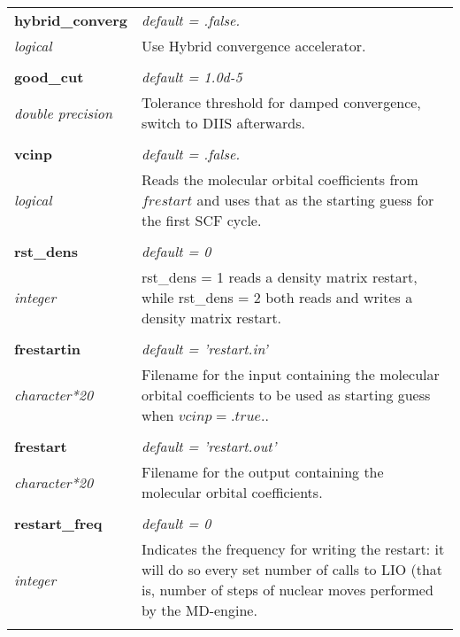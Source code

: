 \begin{Spacing}{1.0}
\begin{longtable}{ p{} p{} }
   \textbf{hybrid\_converg}
   &  \textit{default = .false. }
   \\*\textit{logical}
   & Use Hybrid convergence accelerator.\\* \\

   \textbf{good\_cut}
   &  \textit{default = 1.0d-5}
   \\*\textit{double precision}
   & Tolerance threshold for damped convergence, switch to
   DIIS afterwards.\\* \\

   \textbf{vcinp}
   &  \textit{default = .false. }
   \\*\textit{logical}
   & Reads the molecular orbital coefficients from $frestart$
   and uses that as the starting guess for the first SCF
   cycle.\\* \\

   \textbf{rst\_dens}
   &  \textit{default = 0}
   \\*\textit{integer}
   & rst\_dens = 1 reads a density matrix restart, while rst\_dens = 2
        both reads and writes a density matrix restart. \\
   \\

   \textbf{frestartin}
   &  \textit{default = 'restart.in'}
   \\*\textit{character*20}
   & Filename for the input containing the molecular orbital
   coefficients to be used as starting guess when $vcinp =
   .true.$.\\* \\

   \textbf{frestart}
   &  \textit{default = 'restart.out'}
   \\*\textit{character*20}
   & Filename for the output containing the molecular orbital 
   coefficients.\\* \\

   \textbf{restart\_freq}
   &  \textit{default = 0}
   \\*\textit{integer}
   & Indicates the frequency for writing the restart: it will
   do so every set number of calls to LIO (that is, number of
   steps of nuclear moves performed by the MD-engine.\\* \\

\end{longtable}
\end{Spacing}
